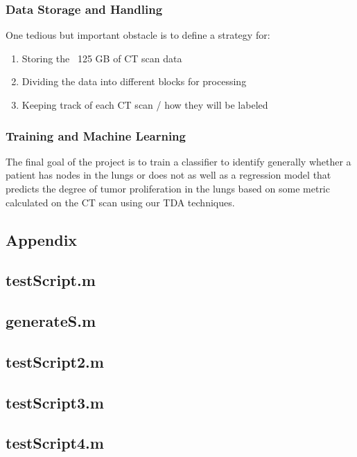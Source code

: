 \documentclass[12pt]{report}
\begin{document}
\subsection{Data Storage and Handling}

One tedious but important obstacle is to define a strategy for:

\begin{enumerate}
	\item Storing the ~125 GB of CT scan data
	\item Dividing the data into different blocks for processing
	\item Keeping track of each CT scan / how they will be labeled
\end{enumerate}

\subsection{Training and Machine Learning}

The final goal of the project is to train a classifier to identify generally whether a patient has nodes in the lungs or does not as well as a regression model that predicts the degree of tumor proliferation in the lungs based on some metric calculated on the CT scan using our TDA techniques.


\begin{appendices}
\chapter{Appendix}
\section{testScript.m}

\section{generateS.m}

\section{testScript2.m}

\section{testScript3.m}

\section{testScript4.m}

\end{appendices}
\end{document}
